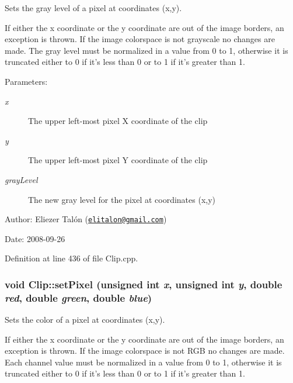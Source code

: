 Sets the gray level of a pixel at coordinates (x,y). 

If either the x coordinate or the y coordinate are out of the image borders, an exception is thrown. If the image colorspace is not grayscale no changes are made. The gray level must be normalized in a value from 0 to 1, otherwise it is truncated either to 0 if it's less than 0 or to 1 if it's greater than 1.

\begin{Desc}
\item[Parameters:]
\begin{description}
\item[{\em x}]The upper left-most pixel X coordinate of the clip \item[{\em y}]The upper left-most pixel Y coordinate of the clip \item[{\em grayLevel}]The new gray level for the pixel at coordinates (x,y)\end{description}
\end{Desc}
\begin{Desc}
\item[Author:]Eliezer Talón (\href{mailto:elitalon@gmail.com}{\tt elitalon@gmail.com}) \end{Desc}
\begin{Desc}
\item[Date:]2008-09-26 \end{Desc}


Definition at line 436 of file Clip.cpp.\hypertarget{class_clip_1e28a9ed2676460de4b5b9ab1b985f4c}{
\subsubsection[setPixel]{\setlength{\rightskip}{0pt plus 5cm}void Clip::setPixel (unsigned int {\em x}, \/  unsigned int {\em y}, \/  double {\em red}, \/  double {\em green}, \/  double {\em blue})}}
\label{class_clip_1e28a9ed2676460de4b5b9ab1b985f4c}


Sets the color of a pixel at coordinates (x,y). 

If either the x coordinate or the y coordinate are out of the image borders, an exception is thrown. If the image colorspace is not RGB no changes are made. Each channel value must be normalized in a value from 0 to 1, otherwise it is truncated either to 0 if it's less than 0 or to 1 if it's greater than 1.

